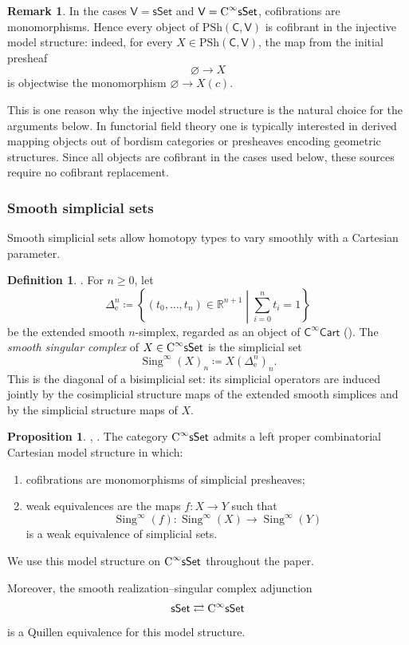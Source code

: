 \documentclass{amsart}
\newcommand{\cat}[1]{\mathsf{#1}}
\newcommand{\sset}{\cat{sSet}}
\DeclareMathOperator{\Sing}{Sing}
\newcommand{\CsSet}{\textnormal{C}^{\infty}\sset}
\newcommand{\Cart}{\cat{C}^{\infty}\cat{Cart}}
\newcommand{\psh}{\mathrm{PSh}}
\newcommand{\RR}{{\mathbb{R}}}
\theoremstyle{definition}
\newtheorem{definition}[equation]{Definition}
\newtheorem{proposition}[equation]{Proposition}
\newtheorem{remark}[equation]{Remark}
\numberwithin{equation}{subsection}
\numberwithin{subsubsection}{subsection}
\begin{document}
\begin{remark}\label{rem:injective.presheaves.cofibrant}
  In the cases \(\cat{V}=\sset\) and \(\cat{V}=\CsSet\), cofibrations are
  monomorphisms. Hence every object of \(\psh(\cat{C},\cat{V})\) is
  cofibrant in the injective model structure: indeed, for every
  \(X\in\psh(\cat{C},\cat{V})\), the map from the initial presheaf
  \[
    \varnothing\to X
  \]
  is objectwise the monomorphism \(\varnothing\to X(c)\).

  This is one reason why the injective model structure is the natural choice
  for the arguments below. In functorial field theory one is typically
  interested in derived mapping objects out of bordism categories or presheaves
  encoding geometric structures.
  Since all objects are cofibrant in the cases used below, these sources
  require no cofibrant replacement.
\end{remark}

\subsubsection{Smooth simplicial sets}
Smooth simplicial sets allow homotopy types to vary smoothly with a Cartesian
parameter.

\begin{definition}\label{def:smooth.singular.complex}
  \textnormal{\cite[Definition~2.2.3]{GP26}}.
  For \(n\geq 0\), let
  \[
    \Delta^n_{\mathrm{e}}
    \coloneqq
    \left\{(t_0,\ldots,t_n)\in\RR^{n+1}
      \middle|
      \sum_{i=0}^{n}t_i=1
    \right\}
  \]
  be the extended smooth \(n\)-simplex, regarded as an object of \(\Cart\)
  (). The \emph{smooth singular complex} of
  \(X\in\CsSet\) is the simplicial set
  \[
    \Sing^\infty(X)_n \coloneqq X(\Delta^n_{\mathrm{e}})_n.
  \]
  This is the diagonal of a bisimplicial set: its simplicial operators are
  induced jointly by the cosimplicial structure maps of the extended smooth
  simplices and by the simplicial structure maps of \(X\).
\end{definition}

\begin{proposition}\label{prop:Cartesian.model.str.smooth.simp.sets}
  \textnormal{\cite[Proposition~2.2.4--2.2.5]{GP26}},
  \textnormal{\cite[Theorem~12.7]{PavlovSmoothOka}}.
  The category \( \CsSet \) admits a left proper combinatorial Cartesian
  model structure in which:
  \begin{enumerate}
    \item cofibrations are monomorphisms of simplicial presheaves;
    \item weak equivalences are the maps \(f:X\to Y\) such that
      \[
        \Sing^\infty(f):\Sing^\infty(X)\longrightarrow \Sing^\infty(Y)
      \]
      is a weak equivalence of simplicial sets.
  \end{enumerate}
  We use this model structure on \( \CsSet \) throughout the paper.

  Moreover, the smooth realization--singular complex adjunction
  \[
    \sset
    \rightleftarrows
    \CsSet
  \]
  is a Quillen equivalence for this model structure.
\end{proposition}
\end{document}
